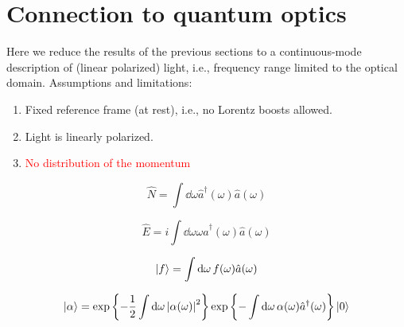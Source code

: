 \section{Connection to quantum optics}

Here we reduce the results of the previous sections to a continuous-mode description of (linear polarized) light, i.e., frequency range limited to the optical domain.
Assumptions and limitations:
\begin{enumerate}
	\item Fixed reference frame (at rest), i.e., no Lorentz boosts allowed.
	\item Light is linearly polarized.
	\item \textcolor{red}{No distribution of the momentum}
\end{enumerate}

\begin{equation}
	\hat{N}
	=
	\int\dd{\omega}
	\hat{a}^\dagger(\omega)
	\hat{a}(\omega)
\end{equation}

\begin{equation}
	\hat{E}
	=
	i
	\int\dd{\omega}
	\omega
	\hat{a}^\dagger(\omega)
	\hat{a}(\omega)
\end{equation}

\begin{equation}
	\ket{f}
	=
	\int\dd{\omega}
	f(\omega)
	\hat{a}(\omega)
\end{equation}

\begin{equation}
	\ket{\alpha}
	=
	\exp\left\{
		-
		\frac{1}{2}
		\int\dd{\omega}
		\abs{\alpha(\omega)}^2
	\right\}
	\exp\left\{
		-
		\int\dd{\omega}
		\alpha(\omega)
		\hat{a}^\dagger(\omega)
	\right\}
	\ket{0}
\end{equation}